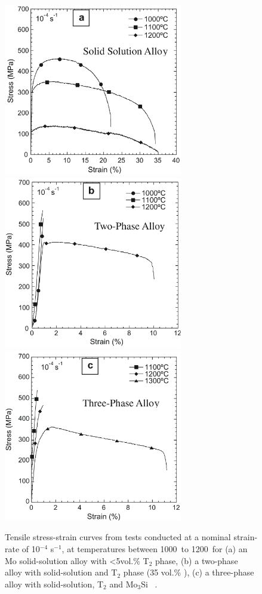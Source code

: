 %
\begin{figure}[H]
\begin{center}
\includegraphics[width=7.8cm]{ku10i}
\includegraphics[width=7.8cm]{ku10ii}
\vspace{5mm} 
\includegraphics[width=7.8cm]{ku10iii}
\caption{Tensile stress-strain curves from tests conducted at a nominal strain-rate of 10$^{-4}$ s$^{-1}$, at temperatures between 1000\celsius\ to 1200\celsius\ for (a) an Mo solid-solution alloy with <5vol.\% T$_2$ phase, (b) a two-phase alloy with solid-solution and T$_2$ phase (35 vol.\% ), (c) a three-phase alloy with solid-solution, T$_2$ and Mo$_3$Si ~\cite{kumar10}.}\label{fig:ku10}
\end{center}
\end{figure} 
%

